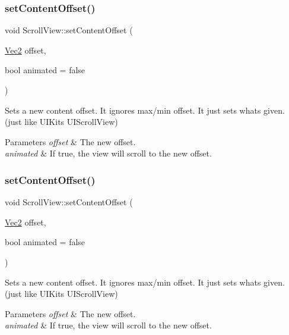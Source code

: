 \subsubsection{\texorpdfstring{set\+Content\+Offset()}{setContentOffset()}\hspace{0.1cm}{\footnotesize\ttfamily [1/2]}}
{\footnotesize\ttfamily void Scroll\+View\+::set\+Content\+Offset (\begin{DoxyParamCaption}\item[{\hyperlink{classVec2}{Vec2}}]{offset,  }\item[{bool}]{animated = {\ttfamily false} }\end{DoxyParamCaption})}

Sets a new content offset. It ignores max/min offset. It just sets what\textquotesingle{}s given. (just like U\+I\+Kit\textquotesingle{}s U\+I\+Scroll\+View)


\begin{DoxyParams}{Parameters}
{\em offset} & The new offset. \\
\hline
{\em animated} & If true, the view will scroll to the new offset. \\
\hline
\end{DoxyParams}
\mbox{\label{classScrollView_ab8bc90e2fef0ba2e8ddf04778bb44dfe}} 
\subsubsection{\texorpdfstring{set\+Content\+Offset()}{setContentOffset()}\hspace{0.1cm}{\footnotesize\ttfamily [2/2]}}
{\footnotesize\ttfamily void Scroll\+View\+::set\+Content\+Offset (\begin{DoxyParamCaption}\item[{\hyperlink{classVec2}{Vec2}}]{offset,  }\item[{bool}]{animated = {\ttfamily false} }\end{DoxyParamCaption})}

Sets a new content offset. It ignores max/min offset. It just sets what\textquotesingle{}s given. (just like U\+I\+Kit\textquotesingle{}s U\+I\+Scroll\+View)


\begin{DoxyParams}{Parameters}
{\em offset} & The new offset. \\
\hline
{\em animated} & If true, the view will scroll to the new offset. \\
\hline
\end{DoxyParams}
\mbox{\label{classScrollView_ad98397d42075b810de17c35eb9843ec7}} 
